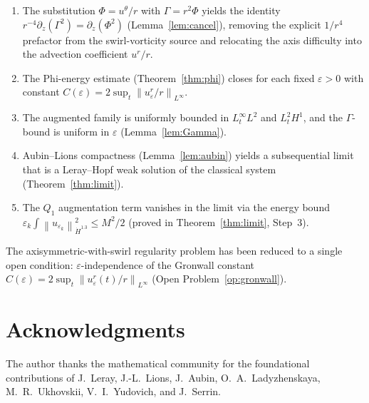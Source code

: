 \documentclass{article}
\theoremstyle{definition}
\theoremstyle{remark}
\newcommand{\e}{\varepsilon}
\newcommand{\norm}[1]{\left\|#1\right\|}
\begin{document}
\begin{enumerate}
  \item The substitution $\Phi = u^\theta/r$ with $\Gamma = r^2\Phi$
    yields the identity $r^{-4}\partial_z(\Gamma^2) = \partial_z(\Phi^2)$
    (Lemma~\ref{lem:cancel}), removing the explicit $1/r^4$ prefactor from
    the swirl-vorticity source and relocating the axis difficulty into the
    advection coefficient $u^r/r$.
    
  \item The Phi-energy estimate (Theorem~\ref{thm:phi}) closes for each
    fixed $\e > 0$ with constant $C(\e) = 2\sup_t\norm{u_\e^r/r}_{L^\infty}$.
    
  \item The augmented family is uniformly bounded in $L^\infty_t L^2$
    and $L^2_t H^1$, and the $\Gamma$-bound is uniform in $\e$
    (Lemma~\ref{lem:Gamma}).
    
  \item Aubin--Lions compactness (Lemma~\ref{lem:aubin}) yields
    a subsequential limit that is a Leray--Hopf weak solution of the
    classical system (Theorem~\ref{thm:limit}).
    
  \item The $Q_1$ augmentation term vanishes in the limit via the
    energy bound $\e_k\int\norm{u_{\e_k}}_{\dot H^{1.3}}^2 \le M^2/2$
    (proved in Theorem~\ref{thm:limit}, Step~3).
\end{enumerate}

\noindent
The axisymmetric-with-swirl regularity problem has been reduced to a
single open condition: $\e$-independence of the Gronwall constant
$C(\e) = 2\sup_t\norm{u_\e^r(t)/r}_{L^\infty}$ (Open Problem~\ref{op:gronwall}).

\section*{Acknowledgments}

The author thanks the mathematical community for the foundational
contributions of J.~Leray, J.-L.~Lions, J.~Aubin, O.~A.~Ladyzhenskaya,
M.~R.~Ukhovskii, V.~I.~Yudovich, and J.~Serrin.
\end{document}
